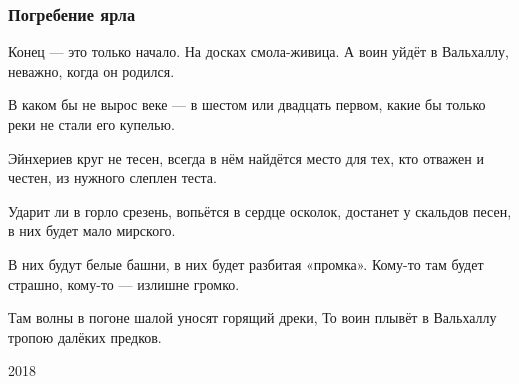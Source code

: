  
 
 

\subsubsection{Погребение ярла}
\label{sec:poetry.rus.dnr.vladislav_rusanov.pogrebenie_jarla}

Конец --- это только начало.
На досках смола-живица.
А воин уйдёт в Вальхаллу,
неважно, когда он родился.

В каком бы не вырос веке —
в шестом или двадцать первом,
какие бы только реки
не стали его купелью.

Эйнхериев круг не тесен,
всегда в нём найдётся место
для тех, кто отважен и честен,
из нужного слеплен теста.

Ударит ли в горло срезень,
вопьётся в сердце осколок,
достанет у скальдов песен,
в них будет мало мирского.

В них будут белые башни,
в них будет разбитая «промка».
Кому-то там будет страшно,
кому-то --- излишне громко.

Там волны в погоне шалой
уносят горящий дреки,
То воин плывёт в Вальхаллу
тропою далёких предков.

2018
